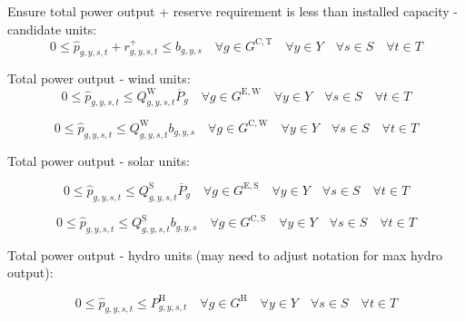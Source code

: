 \documentclass{article}
\newcommand{\sGeneratorsExistingWind}{G^{\mathrm{E,W}}}
\newcommand{\sGeneratorsExistingSolar}{G^{\mathrm{E,S}}}
\newcommand{\sGeneratorsCandidateThermal}{G^{\mathrm{C,T}}}
\newcommand{\sGeneratorsCandidateWind}{G^{\mathrm{C,W}}}
\newcommand{\sGeneratorsCandidateSolar}{G^{\mathrm{C,S}}}
\newcommand{\sGeneratorsHydro}{G^{\mathrm{H}}}
\newcommand{\sYears}{Y}
\newcommand{\sScenarios}{S}
\newcommand{\sIntervals}{T}
\newcommand{\iGenerator}{g}
\newcommand{\iYear}{y}
\newcommand{\iScenario}{s}
\newcommand{\iInterval}{t}
\newcommand{\cPowerOutputMax}[1][\iGenerator,\iYear]{\overline{P}_{#1}}
\newcommand{\cCapacityFactorWind}[1][\iGenerator,\iYear,\iScenario,\iInterval]{Q_{#1}^{\mathrm{W}}}
\newcommand{\cCapacityFactorSolar}[1][\iGenerator,\iYear,\iScenario,\iInterval]{Q_{#1}^{\mathrm{S}}}
\newcommand{\cPowerOutputHydro}[1][\iGenerator,\iYear,\iScenario,\iInterval]{P^{\mathrm{H}}_{#1}}
\newcommand{\vReserveUp}[1][\iGenerator,\iYear,\iScenario,\iInterval]{r^{+}_{#1}}
\newcommand{\vPowerTotal}[1][\iGenerator,\iYear,\iScenario,\iInterval]{\hat{p}_{#1}}
\newcommand{\vInstalledCapacityTotalScenario}[1][\iGenerator,\iYear,\iScenario]{b_{#1}}
\begin{document}
Ensure total power output + reserve requirement is less than installed capacity - candidate units:
\begin{equation}
	0 \leq \vPowerTotal + \vReserveUp \leq \vInstalledCapacityTotalScenario \quad \forall \iGenerator \in \sGeneratorsCandidateThermal \quad \forall \iYear \in \sYears \quad \forall \iScenario \in \sScenarios \quad \forall \iInterval \in \sIntervals
\end{equation}

Total power output - wind units:
\begin{equation}
0 \leq \vPowerTotal \leq \cCapacityFactorWind \cPowerOutputMax[\iGenerator] \quad \forall \iGenerator \in \sGeneratorsExistingWind \quad \forall \iYear \in \sYears \quad \forall \iScenario \in \sScenarios \quad \forall \iInterval \in \sIntervals 
\end{equation}

\begin{equation}
0 \leq \vPowerTotal \leq \cCapacityFactorWind \vInstalledCapacityTotalScenario \quad \forall \iGenerator \in \sGeneratorsCandidateWind \quad \forall \iYear \in \sYears \quad \forall \iScenario \in \sScenarios \quad \forall \iInterval \in \sIntervals
\end{equation}

Total power output - solar units:

\begin{equation}
0 \leq \vPowerTotal \leq \cCapacityFactorSolar \cPowerOutputMax[\iGenerator] \quad \forall \iGenerator \in \sGeneratorsExistingSolar \quad \forall \iYear \in \sYears \quad \forall \iScenario \in \sScenarios \quad \forall \iInterval \in \sIntervals 
\end{equation}

\begin{equation}
0 \leq \vPowerTotal \leq \cCapacityFactorSolar \vInstalledCapacityTotalScenario \quad \forall \iGenerator \in \sGeneratorsCandidateSolar \quad \forall \iYear \in \sYears \quad \forall \iScenario \in \sScenarios \quad \forall \iInterval \in \sIntervals
\end{equation}

Total power output - hydro units (may need to adjust notation for max hydro output):

\begin{equation}
0 \leq \vPowerTotal \leq \cPowerOutputHydro \quad \forall \iGenerator \in \sGeneratorsHydro \quad \forall \iYear \in \sYears \quad \forall \iScenario \in \sScenarios \quad \forall \iInterval \in \sIntervals 
\end{equation}
\end{document}
